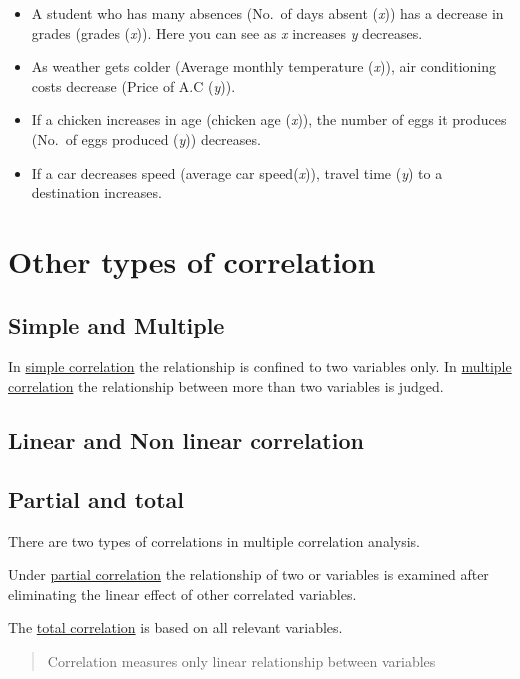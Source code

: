 \documentclass[
]{book}
\begin{document}
\begin{itemize}
\item
  A student who has many absences (No.~of days absent (\emph{x})) has a
  decrease in grades (grades (\emph{x})). Here you can see as \emph{x} increases
  \emph{y} decreases.
\item
  As weather gets colder (Average monthly temperature (\emph{x})), air
  conditioning costs decrease (Price of A.C (\emph{y})).
\item
  If a chicken increases in age (chicken age (\emph{x})), the number of
  eggs it produces (No.~of eggs produced (\emph{y})) decreases.
\item
  If a car decreases speed (average car speed(\emph{x})), travel time (\emph{y})
  to a destination increases.
\end{itemize}

\section{Other types of correlation}\label{other-types-of-correlation}

\subsection{Simple and Multiple}\label{simple-and-multiple}

In \ul{simple correlation} the relationship is confined to two
variables only. In \ul{multiple correlation} the relationship
between more than two variables is judged.

\subsection{Linear and Non linear correlation}\label{linear-and-non-linear-correlation}

\subsection{Partial and total}\label{partial-and-total}

There are two types of correlations in multiple correlation analysis.

Under \ul{partial correlation} the relationship of two or
variables is examined after eliminating the linear effect of other
correlated variables.

The \ul{total correlation} is based on all relevant variables.

\begin{quote}
Correlation measures only linear relationship between variables
\end{quote}
\end{document}
